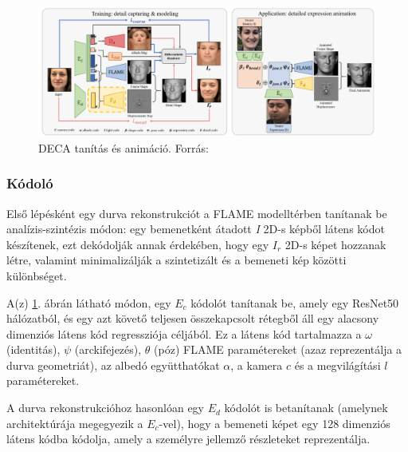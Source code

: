 \documentclass[12pt,a4]{article}
\begin{document}
            \begin{figure}[h]	
     		 \centering
     		 \includegraphics[width=1\linewidth]{deca}
     		 \caption{ DECA tanítás és animáció.
     			    Forrás:\cite{deca}}
                \label{fig:deca}
     	      \end{figure}

            \subsubsection{Kódoló} \label{Kódoló}
    	        Első lépésként egy durva rekonstrukciót a FLAME modelltérben \cite{flame}
                tanítanak be analízis-szintézis módon: egy bemenetként átadott \textit{I} 2D-s képből látens kódot készítenek, ezt dekódolják annak érdekében, hogy egy $I_{r}$ 2D-s képet hozzanak létre, valamint minimalizálják a szintetizált és a bemeneti kép közötti különbséget.
            
    	        A(z) \ref{fig:deca}. ábrán látható módon, egy $E_{c}$ kódolót tanítanak be, amely egy \cite{liwen}ResNet50 hálózatból, és egy azt követő teljesen összekapcsolt rétegből áll egy alacsony dimenziós látens kód regressziója céljából. Ez a látens kód tartalmazza a $\omega$ (identitás), $\psi$ (arckifejezés), $\theta$ (póz) \cite{flame}FLAME paramétereket (azaz reprezentálja a durva geometriát), az albedó együtthatókat $\alpha$, a kamera $c$ és a megvilágítási $l$ paramétereket.
    
                A durva rekonstrukcióhoz hasonlóan egy $E_{d}$ kódolót is betanítanak (amelynek architektúrája megegyezik a $E_{c}$-vel), hogy a bemeneti képet egy 128 dimenziós látens kódba kódolja, amely a személyre jellemző részleteket reprezentálja. 
    
\end{document}
